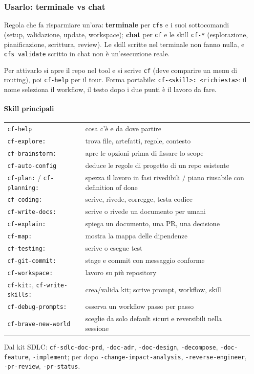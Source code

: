 \documentclass[a4paper,12pt]{article}
\begin{document}
\subsubsection{Usarlo: terminale vs chat}

Regola che fa risparmiare un'ora: \textbf{terminale} per \texttt{cfs} e i suoi
sottocomandi (setup, validazione, update, workspace); \textbf{chat} per \texttt{cf} e le
skill \texttt{cf-*} (esplorazione, pianificazione, scrittura, review). Le skill scritte
nel terminale non fanno nulla, e \texttt{cfs validate} scritto in chat non è
un'esecuzione reale.

Per attivarlo si apre il repo nel tool e si scrive \texttt{cf} (deve comparire un menu di
routing), poi \texttt{cf-help} per il tour. Forma portabile:
\texttt{cf-<skill>: <richiesta>}: il nome seleziona il workflow, il testo dopo i due punti
è il lavoro da fare.

\paragraph{Skill principali}
\begin{center}
\begin{tabular}{|l|p{10.5cm}|}
\hline
\texttt{cf-help} & cosa c'è e da dove partire\\
\texttt{cf-explore:} & trova file, artefatti, regole, contesto\\
\texttt{cf-brainstorm:} & apre le opzioni prima di fissare lo scope\\
\texttt{cf-auto-config} & deduce le regole di progetto di un repo esistente\\
\texttt{cf-plan:} / \texttt{cf-planning:} & spezza il lavoro in fasi rivedibili / piano riusabile con definition of done\\
\texttt{cf-coding:} & scrive, rivede, corregge, testa codice\\
\texttt{cf-write-docs:} & scrive o rivede un documento per umani\\
\texttt{cf-explain:} & spiega un documento, una PR, una decisione\\
\texttt{cf-map:} & mostra la mappa delle dipendenze\\
\texttt{cf-testing:} & scrive o esegue test\\
\texttt{cf-git-commit:} & stage e commit con messaggio conforme\\
\texttt{cf-workspace:} & lavoro su più repository\\
\texttt{cf-kit:}, \texttt{cf-write-skills:} & crea/valida kit; scrive prompt, workflow, skill\\
\texttt{cf-debug-prompts:} & osserva un workflow passo per passo\\
\texttt{cf-brave-new-world} & sceglie da solo default sicuri e reversibili nella sessione\\
\hline
\end{tabular}
\end{center}
Dal kit SDLC: \texttt{cf-sdlc-doc-prd}, \texttt{-doc-adr}, \texttt{-doc-design},
\texttt{-decompose}, \texttt{-doc-feature}, \texttt{-implement}; per dopo
\texttt{-change-impact-analysis}, \texttt{-reverse-engineer}, \texttt{-pr-review},
\texttt{-pr-status}.
\end{document}
